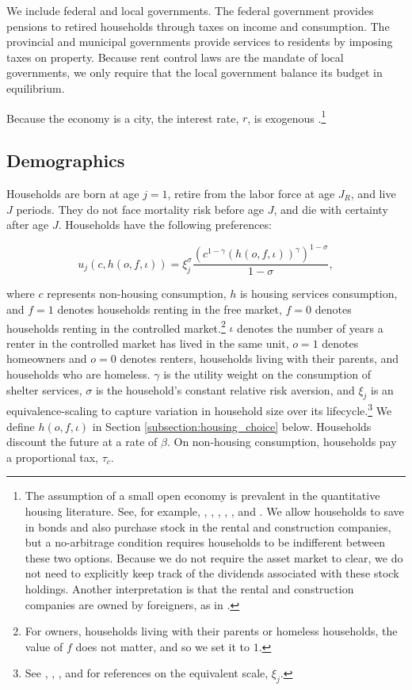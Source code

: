 \documentclass[parskip=full]{article}
\begin{document}
We include federal and local governments. The federal government provides pensions to retired households through taxes on income and consumption. The provincial and municipal governments provide services to residents by imposing taxes on property. Because rent control laws are the mandate of local governments, we only require that the local government balance its budget in equilibrium. 

Because the economy is a city, the interest rate, $r$, is exogenous \citep{sommeretal-2013,arslanetal-2015,sommersullivan-2017,kaplanetal-2019}.\footnote{The assumption of a small open economy is prevalent in the quantitative housing literature. See, for example, \citet{sommeretal-2013}, \citet{arslanetal-2015}, \citet{floettotetal-2016}, \cite{sommersullivan-2017}, \citet{kaplanetal-2019}, and \citet{kkk-2021}. We allow households to save in bonds and also purchase stock in the rental and construction companies, but a no-arbitrage condition requires households to be indifferent between these two options. Because we do not require the asset market to clear, we do not need to explicitly keep track of the dividends associated with these stock holdings. Another interpretation is that the rental and construction companies are owned by foreigners, as in \citet{floettotetal-2016}.}  

\subsection{Demographics}\label{subsection:demographics}

Households are born at age $j=1$, retire from the labor force at age $J_{R}$, and live $J$ periods. They do not face mortality risk before age $J$, and die with certainty after age $J$. Households have the following preferences:

\begin{equation*}
    u_{j}(c,h(o,f,\iota))=\xi_{j}^{\sigma}\frac{\left(c^{1-\gamma} \left(h(o,f,\iota) \right)^{\gamma}\right)^{1-\sigma}}{1-\sigma},
\end{equation*}

\noindent where $c$ represents non-housing consumption, $h$ is housing services consumption, and $f=1$ denotes households renting in the free market, $f=0$ denotes households renting in the controlled market.\footnote{For owners, households living with their parents or homeless households, the value of $f$ does not matter, and so we set it to $1$.} $\iota$ denotes the number of years a renter in the controlled market has lived in the same unit, $o=1$ denotes homeowners and $o=0$ denotes renters, households living with their parents, and households who are homeless. $\gamma$ is the utility weight on the consumption of shelter services, $\sigma$ is the household's constant relative risk aversion, and $\xi_{j}$ is an equivalence-scaling to capture variation in household size over its lifecycle.\footnote{See \citet{lm-1980}, \citet{wz-2010}, \citet{xu-2013}, and \citet{rs-2023} for references on the equivalent scale, $\xi_{j}$.} We define $h(o,f,\iota)$ in Section \ref{subsection:housing_choice} below. Households discount the future at a rate of $\beta$. On non-housing consumption, households pay a proportional tax, $\tau_{c}$.
\end{document}
